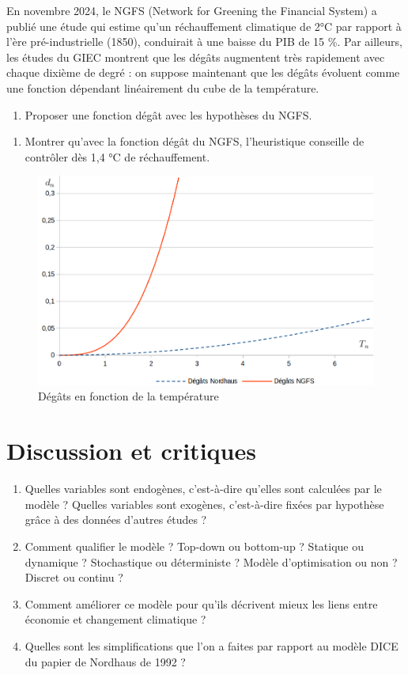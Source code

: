 \documentclass[12pt]{article}
\newcommand{\ques}[1]{\begin{enumerate}[resume]
\item  #1
\end{enumerate}}
\newcommand{\rep}[1]{\textit{Réponse :} #1 \\}
\renewcommand{\rep}[1]{ }
\theoremstyle{remark}
\begin{document}
En novembre 2024, le NGFS (Network for Greening the Financial System) a publié une étude qui estime qu'un réchauffement climatique de 2°C par rapport à l'ère pré-industrielle (1850), conduirait à une baisse du PIB de 15 \%. Par ailleurs, les études du GIEC montrent que les dégâts augmentent très rapidement avec chaque dixième de degré : on suppose maintenant que les dégâts évoluent comme une fonction dépendant linéairement du cube de la température.
\ques{Proposer une fonction dégât avec les hypothèses du NGFS.}
\rep{\begin{equation*} d_n = 0,15 (\frac{T_n}{2})^3\end{equation*}}

\ques{Montrer qu'avec la fonction dégât du NGFS, l'heuristique conseille de contrôler dès 1,4 °C de réchauffement.}
\rep{Lecture graphique ou calculer $2\times (0,05/0,15)^{1/3}=1,39$ °C.}


\begin{figure}[h]
\centering
\includegraphics[scale=0.35]{images/fonction_degats.png}
\caption{Dégâts en fonction de la température}
\end{figure}

\section{Discussion et critiques}
\begin{enumerate}[resume]
\item Quelles variables sont endogènes, c'est-à-dire qu'elles sont calculées par le modèle ? Quelles variables sont exogènes, c'est-à-dire fixées par hypothèse grâce à des données d'autres études ?
\item Comment qualifier le modèle ? Top-down ou bottom-up ? Statique ou dynamique ? Stochastique ou déterministe ? Modèle d'optimisation ou non ? Discret ou continu ?
\item Comment améliorer ce modèle pour qu'ils décrivent mieux les liens entre économie et changement climatique ?
\item Quelles sont les simplifications que l'on a faites par rapport au modèle DICE du papier de Nordhaus de 1992 ?
\end{enumerate}
\end{document}
